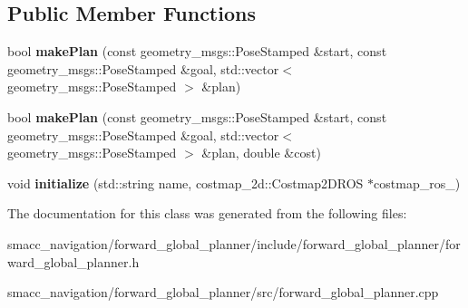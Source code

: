 \subsection*{Public Member Functions}
\begin{DoxyCompactItemize}
\item 
\mbox{\label{classforward__global__planner_1_1ForwardGlobalPlanner_a0a358a0d157214dfc0a8a5d11a8f3419}} 
bool {\bfseries make\+Plan} (const geometry\+\_\+msgs\+::\+Pose\+Stamped \&start, const geometry\+\_\+msgs\+::\+Pose\+Stamped \&goal, std\+::vector$<$ geometry\+\_\+msgs\+::\+Pose\+Stamped $>$ \&plan)
\item 
\mbox{\label{classforward__global__planner_1_1ForwardGlobalPlanner_ae5179c8eaf5b753141b58b80be65c240}} 
bool {\bfseries make\+Plan} (const geometry\+\_\+msgs\+::\+Pose\+Stamped \&start, const geometry\+\_\+msgs\+::\+Pose\+Stamped \&goal, std\+::vector$<$ geometry\+\_\+msgs\+::\+Pose\+Stamped $>$ \&plan, double \&cost)
\item 
\mbox{\label{classforward__global__planner_1_1ForwardGlobalPlanner_ab7bdd2ba109a83441f4863b6ffe0d748}} 
void {\bfseries initialize} (std\+::string name, costmap\+\_\+2d\+::\+Costmap2\+D\+R\+OS $\ast$costmap\+\_\+ros\+\_\+)
\end{DoxyCompactItemize}


The documentation for this class was generated from the following files\+:\begin{DoxyCompactItemize}
\item 
smacc\+\_\+navigation/forward\+\_\+global\+\_\+planner/include/forward\+\_\+global\+\_\+planner/forward\+\_\+global\+\_\+planner.\+h\item 
smacc\+\_\+navigation/forward\+\_\+global\+\_\+planner/src/forward\+\_\+global\+\_\+planner.\+cpp\end{DoxyCompactItemize}
